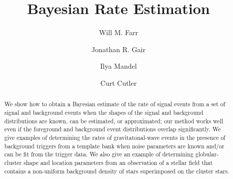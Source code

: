 \documentclass[aps,prd]{revtex4-1}
\begin{document}
\title{Bayesian Rate Estimation}

\author{Will M. Farr} 

\author{Jonathan R. Gair} 

\author{Ilya Mandel} 
 
  
\author{Curt Cutler} 



\begin{abstract}
  We show how to obtain a Bayesian estimate of the rate of signal
  events from a set of signal and background events when the shapes of
  the signal and background distributions are known, can be estimated,
  or approximated; our method works well even if the foreground and
  background event distributions overlap significantly.  We give
  examples of determining the rates of gravitatonal-wave events in the
  presence of background triggers from a template bank when noise
  parameters are known and/or can be fit from the trigger data.  We
  also give an example of determining globular-cluster shape and
  location parameters from an observation of a stellar field that
  contains a non-uniform background density of stars superimposed on
  the cluster stars.
\end{abstract}

\maketitle
\end{document}
